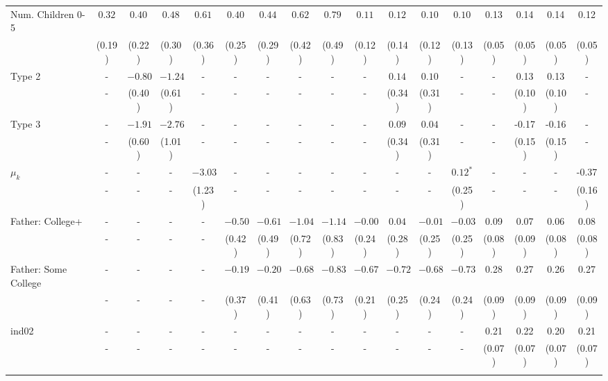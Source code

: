 \begin{tabular}{lcccccccccccccccc}
Num. Children 0-5&$0.32$&$0.40$&$0.48$&$0.61$&$0.40$&$0.44$&$0.62$&$0.79$&$0.11$&$0.12$&$0.10$&$0.10$&0.13&0.14&0.14&0.12\\
&(0.19)&(0.22)&(0.30)&(0.36)&(0.25)&(0.29)&(0.42)&(0.49)&(0.12)&(0.14)&(0.12)&(0.13)&(0.05)&(0.05)&(0.05)&(0.05)\\
Type 2&-&$-0.80$&$-1.24$&-&-&-&-&-&-&$0.14$&$0.10$&-&-&0.13&0.13&-\\
&-&(0.40)&(0.61)&-&-&-&-&-&-&(0.34)&(0.31)&-&-&(0.10)&(0.10)&-\\
Type 3&-&$-1.91$&$-2.76$&-&-&-&-&-&-&$0.09$&$0.04$&-&-&-0.17&-0.16&-\\
&-&(0.60)&(1.01)&-&-&-&-&-&-&(0.34)&(0.31)&-&-&(0.15)&(0.15)&-\\
$\mu_{k}$&-&-&-&$-3.03$&-&-&-&-&-&-&-&$0.12^{*}$&-&-&-&-0.37\\
&-&-&-&(1.23)&-&-&-&-&-&-&-&(0.25)&-&-&-&(0.16)\\
Father: College+&-&-&-&-&$-0.50$&$-0.61$&$-1.04$&$-1.14$&$-0.00$&$0.04$&$-0.01$&$-0.03$&0.09&0.07&0.06&0.08\\
&-&-&-&-&(0.42)&(0.49)&(0.72)&(0.83)&(0.24)&(0.28)&(0.25)&(0.25)&(0.08)&(0.09)&(0.08)&(0.08)\\
Father: Some College&-&-&-&-&$-0.19$&$-0.20$&$-0.68$&$-0.83$&$-0.67$&$-0.72$&$-0.68$&$-0.73$&0.28&0.27&0.26&0.27\\
&-&-&-&-&(0.37)&(0.41)&(0.63)&(0.73)&(0.21)&(0.25)&(0.24)&(0.24)&(0.09)&(0.09)&(0.09)&(0.09)\\
ind02&-&-&-&-&-&-&-&-&-&-&-&-&0.21&0.22&0.20&0.21\\
&-&-&-&-&-&-&-&-&-&-&-&-&(0.07)&(0.07)&(0.07)&(0.07)\\
\\
\bottomrule\end{tabular}